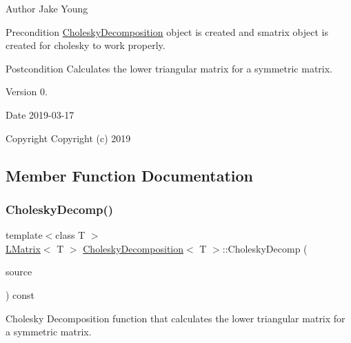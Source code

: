 \begin{DoxyAuthor}{Author}
Jake Young 
\end{DoxyAuthor}
\begin{DoxyPrecond}{Precondition}
\mbox{\hyperlink{class_cholesky_decomposition}{Cholesky\+Decomposition}} object is created and smatrix object is created for cholesky to work properly. 
\end{DoxyPrecond}
\begin{DoxyPostcond}{Postcondition}
Calculates the lower triangular matrix for a symmetric matrix. 
\end{DoxyPostcond}
\begin{DoxyVersion}{Version}
0. 
\end{DoxyVersion}
\begin{DoxyDate}{Date}
2019-\/03-\/17
\end{DoxyDate}
\begin{DoxyCopyright}{Copyright}
Copyright (c) 2019 
\end{DoxyCopyright}


\subsection{Member Function Documentation}
\mbox{\label{class_cholesky_decomposition_a2e61ad86b4d08faac1c7b3268ba77c9d}} 
\subsubsection{\texorpdfstring{CholeskyDecomp()}{CholeskyDecomp()}}
{\footnotesize\ttfamily template$<$class T $>$ \\
\mbox{\hyperlink{class_l_matrix}{L\+Matrix}}$<$ T $>$ \mbox{\hyperlink{class_cholesky_decomposition}{Cholesky\+Decomposition}}$<$ T $>$\+::Cholesky\+Decomp (\begin{DoxyParamCaption}\item[{const \mbox{\hyperlink{class_s_matrix}{S\+Matrix}}$<$ T $>$ \&}]{source }\end{DoxyParamCaption}) const}



Cholesky Decomposition function that calculates the lower triangular matrix for a symmetric matrix. 

